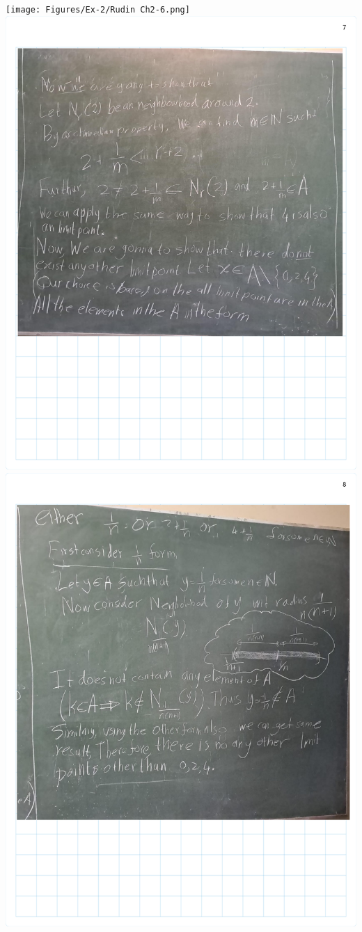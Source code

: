 \documentclass[
]{book}
\theoremstyle{definition}
\theoremstyle{definition}
\theoremstyle{definition}
\theoremstyle{definition}
\theoremstyle{remark}
\begin{document}
\texttt{[image: Figures/Ex-2/Rudin Ch2-6.png]}
\includegraphics{Figures/Ex-2/Rudin Ch2-7.png}
\includegraphics{Figures/Ex-2/Rudin Ch2-8.png}
\end{document}
